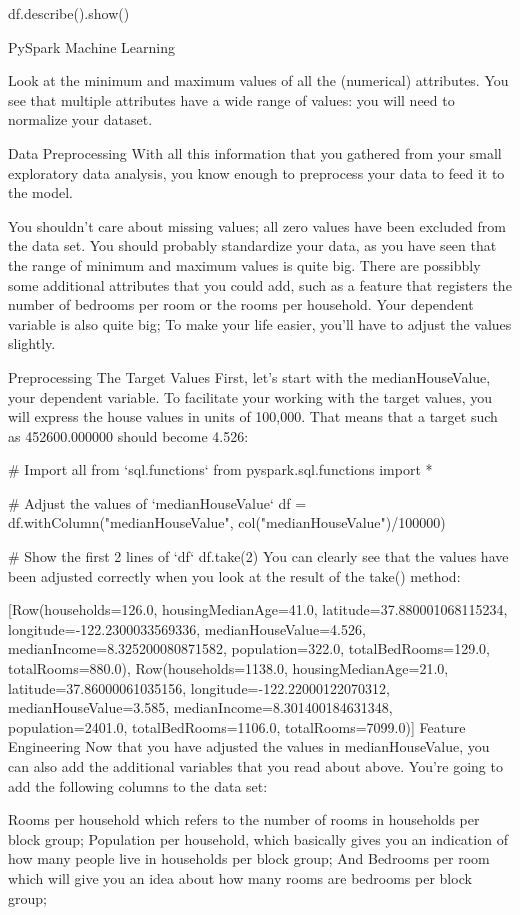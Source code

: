 \documentclass[a4paper,12pt]{article}
\begin{document}
df.describe().show()

PySpark Machine Learning


Look at the minimum and maximum values of all the (numerical) attributes. You see that multiple attributes have a wide range of values: you will need to normalize your dataset.

Data Preprocessing
With all this information that you gathered from your small exploratory data analysis, you know enough to preprocess your data to feed it to the model.

You shouldn’t care about missing values; all zero values have been excluded from the data set.
You should probably standardize your data, as you have seen that the range of minimum and maximum values is quite big.
There are possibbly some additional attributes that you could add, such as a feature that registers the number of bedrooms per room or the rooms per household.
Your dependent variable is also quite big; To make your life easier, you’ll have to adjust the values slightly.

Preprocessing The Target Values
First, let’s start with the medianHouseValue, your dependent variable. To facilitate your working with the target values, you will express the house values in units of 100,000. That means that a target such as 452600.000000 should become 4.526:

# Import all from `sql.functions` 
from pyspark.sql.functions import *

# Adjust the values of `medianHouseValue`
df = df.withColumn("medianHouseValue", col("medianHouseValue")/100000)

# Show the first 2 lines of `df`
df.take(2)
You can clearly see that the values have been adjusted correctly when you look at the result of the take() method:

[Row(households=126.0, housingMedianAge=41.0, latitude=37.880001068115234, longitude=-122.2300033569336, medianHouseValue=4.526, medianIncome=8.325200080871582, population=322.0, totalBedRooms=129.0, totalRooms=880.0), Row(households=1138.0, housingMedianAge=21.0, latitude=37.86000061035156, longitude=-122.22000122070312, medianHouseValue=3.585, medianIncome=8.301400184631348, population=2401.0, totalBedRooms=1106.0, totalRooms=7099.0)]
Feature Engineering
Now that you have adjusted the values in medianHouseValue, you can also add the additional variables that you read about above. You’re going to add the following columns to the data set:

Rooms per household which refers to the number of rooms in households per block group;
Population per household, which basically gives you an indication of how many people live in households per block group; And
Bedrooms per room which will give you an idea about how many rooms are bedrooms per block group;
\end{document}
